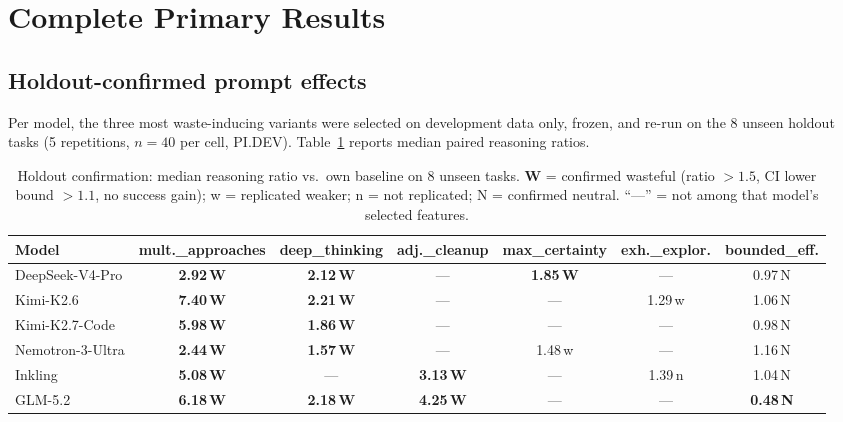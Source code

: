 \documentclass[11pt]{article}
\newcommand{\pidev}{PI.DEV}
\begin{document}
\section{Complete Primary Results}
\label{app:results}

\subsection{Holdout-confirmed prompt effects}

Per model, the three most waste-inducing variants were selected on
development data only, frozen, and re-run on the 8 unseen holdout tasks
(5 repetitions, $n{=}40$ per cell, \pidev). Table~\ref{tab:holdout}
reports median paired reasoning ratios.

\begin{table}[t]
\centering
\small
\begin{tabular}{lcccccc}
\toprule
Model & mult.\_approaches & deep\_thinking & adj.\_cleanup &
max\_certainty & exh.\_explor. & bounded\_eff. \\
\midrule
DeepSeek-V4-Pro & \textbf{2.92\,W} & \textbf{2.12\,W} & --- & \textbf{1.85\,W} & --- & 0.97\,N \\
Kimi-K2.6 & \textbf{7.40\,W} & \textbf{2.21\,W} & --- & --- & 1.29\,w & 1.06\,N \\
Kimi-K2.7-Code & \textbf{5.98\,W} & \textbf{1.86\,W} & --- & --- & --- & 0.98\,N \\
Nemotron-3-Ultra & \textbf{2.44\,W} & \textbf{1.57\,W} & --- & 1.48\,w & --- & 1.16\,N \\
Inkling & \textbf{5.08\,W} & --- & \textbf{3.13\,W} & --- & 1.39\,n & 1.04\,N \\
GLM-5.2 & \textbf{6.18\,W} & \textbf{2.18\,W} & \textbf{4.25\,W} & --- & --- & \textbf{0.48\,N} \\
\bottomrule
\end{tabular}
\caption{Holdout confirmation: median reasoning ratio vs.\ own baseline on
8 unseen tasks. \textbf{W} = confirmed wasteful (ratio $>1.5$, CI lower
bound $>1.1$, no success gain); w = replicated weaker; n = not replicated;
N = confirmed neutral. ``---'' = not among that model's selected
features.}
\label{tab:holdout}
\end{table}
\end{document}

